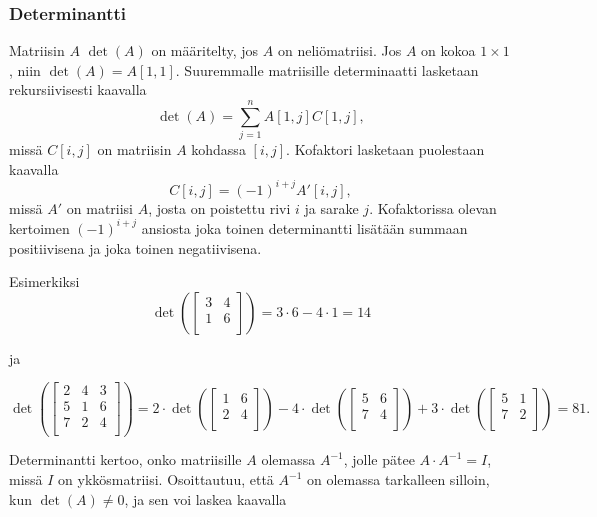 \subsubsection{Determinantti}


Matriisin $A$  $\det(A)$
on määritelty, jos $A$ on neliömatriisi.
Jos $A$ on kokoa $1 \times 1$,
niin $\det(A)=A[1,1]$.
Suuremmalle matriisille determinaatti lasketaan rekursiivisesti
kaavalla 
\[\det(A)=\sum_{j=1}^n A[1,j] C[1,j],\]
missä $C[i,j]$ on matriisin $A$ 
kohdassa $[i,j]$.
Kofaktori lasketaan puolestaan kaavalla
\[C[i,j] = (-1)^{i+j} A'[i,j],\]
missä $A'$ on matriisi $A$, josta on poistettu
rivi $i$ ja sarake $j$.
Kofaktorissa olevan kertoimen $(-1)^{i+j}$ ansiosta
joka toinen determinantti
lisätään summaan positiivisena
ja joka toinen negatiivisena.

\begin{samepage}
Esimerkiksi
\[
\det(
 \begin{bmatrix}
  3 & 4 \\
  1 & 6 \\
 \end{bmatrix}
) = 3 \cdot 6 - 4 \cdot 1 = 14 
\]
\end{samepage}

ja

\[
\det(
 \begin{bmatrix}
  2 & 4 & 3 \\
  5 & 1 & 6 \\
  7 & 2 & 4 \\
 \end{bmatrix}
) = 
2 \cdot
\det(
 \begin{bmatrix}
  1 & 6 \\
  2 & 4 \\
 \end{bmatrix}
)
-4 \cdot
\det(
 \begin{bmatrix}
  5 & 6 \\
  7 & 4 \\
 \end{bmatrix}
)
+3 \cdot
\det(
 \begin{bmatrix}
  5 & 1 \\
  7 & 2 \\
 \end{bmatrix}
) = 81.
\]


Determinantti kertoo, onko matriisille
$A$ olemassa 
$A^{-1}$, jolle pätee $A \cdot A^{-1} = I$,
missä $I$ on ykkösmatriisi.
Osoittautuu, että $A^{-1}$ on olemassa
tarkalleen silloin, kun $\det(A) \neq 0$,
ja sen voi laskea kaavalla

